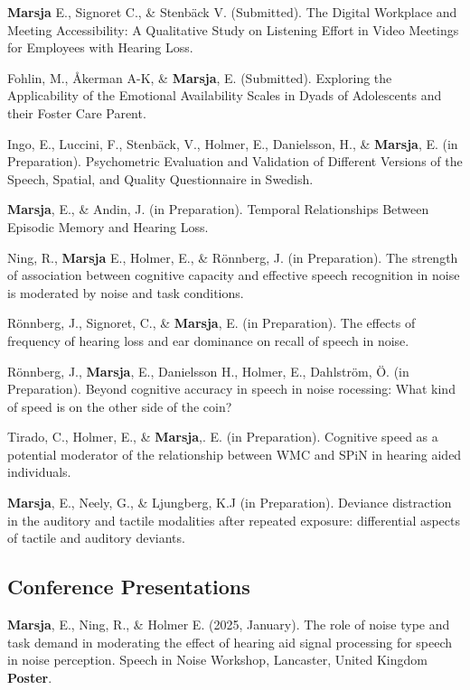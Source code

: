 \documentclass[]{article}
\begin{document}
\textbf{Marsja} E., Signoret C., \& Stenbäck V. (Submitted). The Digital
Workplace and Meeting Accessibility: A Qualitative Study on Listening
Effort in Video Meetings for Employees with Hearing Loss.

Fohlin, M., Åkerman A-K, \& \textbf{Marsja}, E. (Submitted). Exploring
the Applicability of the Emotional Availability Scales in Dyads of
Adolescents and their Foster Care Parent.

Ingo, E., Luccini, F., Stenbäck, V., Holmer, E., Danielsson, H., \&
\textbf{Marsja}, E. (in Preparation). Psychometric Evaluation and
Validation of Different Versions of the Speech, Spatial, and Quality
Questionnaire in Swedish.

\textbf{Marsja}, E., \& Andin, J. (in Preparation). Temporal
Relationships Between Episodic Memory and Hearing Loss.

Ning, R., \textbf{Marsja} E., Holmer, E., \& Rönnberg, J. (in
Preparation). The strength of association between cognitive capacity and
effective speech recognition in noise is moderated by noise and task
conditions.

Rönnberg, J., Signoret, C., \& \textbf{Marsja}, E. (in Preparation). The
effects of frequency of hearing loss and ear dominance on recall of
speech in noise.

Rönnberg, J., \textbf{Marsja}, E., Danielsson H., Holmer, E., Dahlström,
Ö. (in Preparation). Beyond cognitive accuracy in speech in noise
rocessing: What kind of speed is on the other side of the coin?

Tirado, C., Holmer, E., \& \textbf{Marsja},. E. (in Preparation).
Cognitive speed as a potential moderator of the relationship between WMC
and SPiN in hearing aided individuals.

\textbf{Marsja}, E., Neely, G., \& Ljungberg, K.J (in Preparation).
Deviance distraction in the auditory and tactile modalities after
repeated exposure: differential aspects of tactile and auditory
deviants.

\subsection{Conference Presentations}\label{conference-presentations}

\textbf{Marsja}, E., Ning, R., \& Holmer E. (2025, January). The role of
noise type and task demand in moderating the effect of hearing aid
signal processing for speech in noise perception. Speech in Noise
Workshop, Lancaster, United Kingdom \textbf{Poster}.
\end{document}
